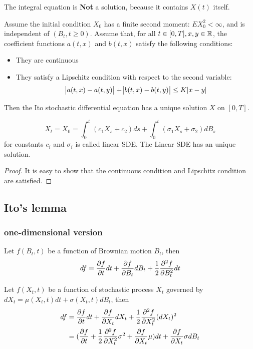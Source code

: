 \begin{refsection}
\begin{remark}
	The integral equation is \textbf{Not} a solution, because it contains $X(t)$ itself.
\end{remark}

\begin{theorem}[existence]
	\cite[138]{mikosch1998elementary}
	Assume the initial condition $X_0$ has a finite second moment: $EX_0^2<\infty$, and is independent of $(B_t,t\geq 0)$. Assume that, for all $t\in [0,T],x,y\in \mathbb{R}$, the coefficient functions $a(t,x)$ and $b(t,x)$ satisfy the following conditions:
	\begin{itemize}
		\item They are continuous
		\item They satisfy a Lipschitz condition with respect to the second variable:
		$$\abs{a(t,x) - a(t,y)} + \abs{b(t,x) - b(t,y)} \leq K\abs{x-y}$$
	\end{itemize}
	Then the Ito stochastic differential equation has a unique solution $X$ on $[0,T]$.
\end{theorem}


\begin{theorem}
	$$X_t = X_0 = \int_0^t (c_1 X_s + c_2)ds +\int_0^t(\sigma_1 X_s +\sigma_2) dB_s$$
	for constants $c_i$ and $\sigma_i$ is called linear SDE. The Linear SDE has an unique solution.
\end{theorem}
\begin{proof}
	It is easy to show that the continuous condition and Lipschitz condition are satisfied. 
\end{proof}





\subsection{Ito's lemma}
\subsubsection{one-dimensional version}
\begin{lemma}\cite[79]{wiersema2008brownian}\label{ch:theory-of-stochastic-process:th:itolemma}
	Let $f(B_t,t)$ be a function of Brownian motion $B_t$, then
	$$df = \frac{\partial f}{\partial t}dt + \frac{\partial f}{\partial B_t}dB_t + \frac{1}{2}\frac{\partial^2 f}{\partial B_t^2}dt$$
\end{lemma}

\begin{lemma}
	Let $f(X_t,t)$ be a function of stochastic process $X_t$ governed by $dX_t = \mu(X_t,t)dt + \sigma(X_t,t)dB_t$, then
	\begin{align*}
	df &= \frac{\partial f}{\partial t}dt + \frac{\partial f}{\partial X_t}dX_t + \frac{1}{2}\frac{\partial^2 f}{\partial X_t^2}(dX_t)^2 \\
	&= (\frac{\partial f}{\partial t} + \frac{1}{2}\frac{\partial^2 f}{\partial X_t^2}\sigma^2 + \frac{\partial f}{\partial X_t}\mu)dt + \frac{\partial f}{\partial X_t}\sigma dB_t
	\end{align*}
\end{lemma}



\end{refsection}
